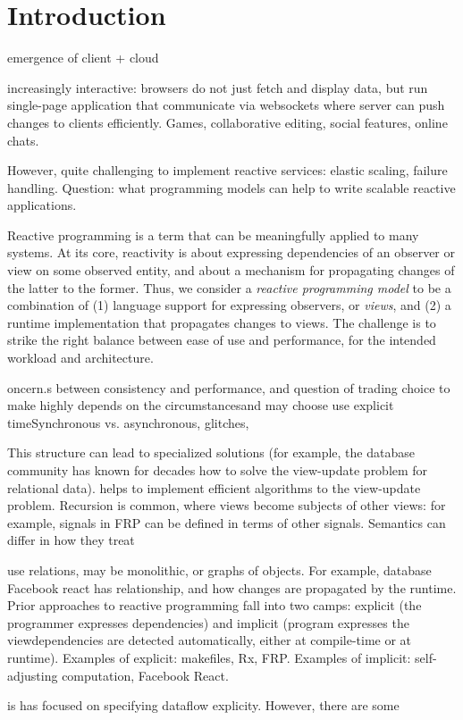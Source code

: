 \section{Introduction}

emergence of client + cloud


increasingly interactive: browsers do not just fetch and display data, but run single-page application that communicate via websockets where server can push changes to clients efficiently. Games, collaborative editing, social features, online chats.

However, quite challenging to implement reactive services: elastic scaling, failure handling. Question: what programming models can help to write scalable reactive applications. 


Reactive programming is a term that can be meaningfully applied to many systems. At its core, reactivity is about expressing dependencies of an observer or view on some observed entity, and about a mechanism for propagating changes of the latter to the former. Thus, we consider a \emph{reactive programming model} to be a combination of (1) language support for expressing observers, or \emph{views}, and (2) a runtime implementation that propagates changes to views. The challenge is to strike the right balance between ease of use and performance, for the intended workload and architecture.



oncern.s between consistency and performance, and question of trading  choice to make highly depends on the circumstancesand may choose use explicit timeSynchronous vs. asynchronous, glitches, 
 
This structure can lead to specialized solutions (for example, the database community has known for decades how to solve the view-update problem for relational data). helps to implement efficient algorithms  to the view-update problem. Recursion is common, where views become subjects of other views: for example, signals in FRP can be defined in terms of other signals. Semantics can differ in how they treat 


use relations, may be monolithic, or graphs of objects. For example, database Facebook react has 
relationship, and how changes are propagated by the runtime. Prior approaches to reactive programming fall into two camps: explicit (the programmer expresses dependencies) and implicit (program expresses the viewdependencies are detected automatically, either at compile-time or at runtime).
Examples of explicit: makefiles, Rx, FRP. Examples of implicit: self-adjusting computation, Facebook React.


  is has focused on specifying dataflow explicity. However, there are some 


